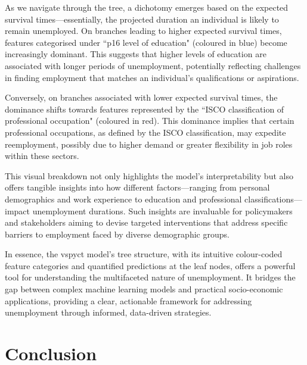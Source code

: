 \documentclass[3p,review,authoryear]{elsarticle}
\begin{document}
As we navigate through the tree, a dichotomy emerges based on the expected survival times—essentially, the projected duration an individual is likely to remain unemployed.
On branches leading to higher expected survival times, features categorised under ``p16 level of education" (coloured in blue) become increasingly dominant.
This suggests that higher levels of education are associated with longer periods of unemployment, potentially reflecting challenges in finding employment that matches an individual's qualifications or aspirations.

Conversely, on branches associated with lower expected survival times, the dominance shifts towards features represented by the ``ISCO classification of professional occupation" (coloured in red).
This dominance implies that certain professional occupations, as defined by the ISCO classification, may expedite reemployment, possibly due to higher demand or greater flexibility in job roles within these sectors.

This visual breakdown not only highlights the model's interpretability but also offers tangible insights into how different factors—ranging from personal demographics and work experience to education and professional classifications—impact unemployment durations.
Such insights are invaluable for policymakers and stakeholders aiming to devise targeted interventions that address specific barriers to employment faced by diverse demographic groups.

In essence, the \gls{vspyct} model's tree structure, with its intuitive colour-coded feature categories and quantified predictions at the leaf nodes, offers a powerful tool for understanding the multifaceted nature of unemployment.
It bridges the gap between complex machine learning models and practical socio-economic applications, providing a clear, actionable framework for addressing unemployment through informed, data-driven strategies.

\section{Conclusion}
\end{document}
